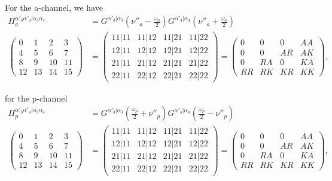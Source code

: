\documentclass[12pt,a4paper,roman]{article}
\begin{document}
For the a-channel, we have
\begin{align}
\Pi_a^{\alpha'_3\alpha'_4|\alpha_3\alpha_4} &= G^{\alpha'_3|\alpha_3}\left(\nu''_a-\frac{\omega_a}{2}\right)G^{\alpha'_4|\alpha_4}\left(\nu''_a+\frac{\omega_a}{2}\right)\\
\begin{pmatrix}
0  & 1  & 2   & 3\\
4  & 5  & 6   & 7\\
8  & 9  & 10 & 11\\
12& 13&14 & 15
\end{pmatrix} &=
\begin{pmatrix}
11|11 & 11|12 & 11|21 & 11|22 \\
12|11 & 12|12 & 12|21 & 12|22\\
21|11 & 21|12 & 21|21 & 21|22\\
22|11 & 22|12 & 22|21 & 22|22
\end{pmatrix} = \begin{pmatrix}
0    & 0    & 0    & AA \\
0    & 0    & AR & AK\\
0    & RA & 0    & KA\\
RR & RK & KR & KK
\end{pmatrix},
\label{eq:Pia}
\end{align}

for the p-channel
\begin{align}
\Pi_p^{\alpha'_3\alpha'_4|\alpha_3\alpha_4} &= G^{\alpha'_3|\alpha_3}\left(\frac{\omega_p}{2}+\nu''_p\right)G^{\alpha'_4|\alpha_4}\left(\frac{\omega_p}{2}-\nu''_p\right)\\
\begin{pmatrix}
0  & 1  & 2   & 3\\
4  & 5  & 6   & 7\\
8  & 9  & 10 & 11\\
12& 13&14 & 15
\end{pmatrix} &=
\begin{pmatrix}
11|11 & 11|12 & 11|21 & 11|22 \\
12|11 & 12|12 & 12|21 & 12|22\\
21|11 & 21|12 & 21|21 & 21|22\\
22|11 & 22|12 & 22|21 & 22|22
\end{pmatrix} = \begin{pmatrix}
0    & 0    & 0    & AA \\
0    & 0    & AR & AK\\
0    & RA & 0    & KA\\
RR & RK & KR & KK
\end{pmatrix},
\label{eq:Pip}
\end{align}
\end{document}
